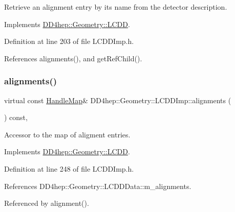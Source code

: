 Retrieve an alignment entry by it\textquotesingle{}s name from the detector description. 



Implements \hyperlink{class_d_d4hep_1_1_geometry_1_1_l_c_d_d_a5661c5a5c9519f58e3044fa66e5393fa}{D\+D4hep\+::\+Geometry\+::\+L\+C\+DD}.



Definition at line 203 of file L\+C\+D\+D\+Imp.\+h.



References alignments(), and get\+Ref\+Child().

\hypertarget{class_d_d4hep_1_1_geometry_1_1_l_c_d_d_imp_a0485d198203f72180e45aa12832c5f5e}{}\label{class_d_d4hep_1_1_geometry_1_1_l_c_d_d_imp_a0485d198203f72180e45aa12832c5f5e} 
\subsubsection{\texorpdfstring{alignments()}{alignments()}}
{\footnotesize\ttfamily virtual const \hyperlink{class_d_d4hep_1_1_geometry_1_1_l_c_d_d_a05cb11e7355772c7b0794bcca59bf477}{Handle\+Map}\& D\+D4hep\+::\+Geometry\+::\+L\+C\+D\+D\+Imp\+::alignments (\begin{DoxyParamCaption}{ }\end{DoxyParamCaption}) const\hspace{0.3cm}{\ttfamily [inline]}, {\ttfamily [virtual]}}



Accessor to the map of aligment entries. 



Implements \hyperlink{class_d_d4hep_1_1_geometry_1_1_l_c_d_d_a48553ea87301f9eb1237e41e7e2a0f16}{D\+D4hep\+::\+Geometry\+::\+L\+C\+DD}.



Definition at line 248 of file L\+C\+D\+D\+Imp.\+h.



References D\+D4hep\+::\+Geometry\+::\+L\+C\+D\+D\+Data\+::m\+\_\+alignments.



Referenced by alignment().

\hypertarget{class_d_d4hep_1_1_geometry_1_1_l_c_d_d_imp_a3dfdf0180fa0a61067bd1f12fa15ecd6}{}\label{class_d_d4hep_1_1_geometry_1_1_l_c_d_d_imp_a3dfdf0180fa0a61067bd1f12fa15ecd6} 
